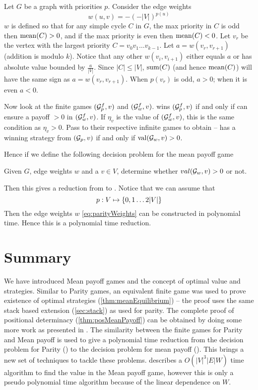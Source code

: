 Let $G$ be a graph with priorities $p$. Consider the edge weights
\begin{equation}
    \label{eq:parityWeights}
    w(u,v) = -(-|V|)^{p(u)}
\end{equation}
$w$ is defined so that for any simple cycle $C$ in $G$, the max priority in $C$ is odd then $\operatorname*{mean}(C)>0$, and if the max priority is even then $\operatorname*{mean}(C)<0$. Let $v_r$ be the vertex with the largest priority $C=v_0v_1 \ldots v_{k-1}$. Let $a=w(v_r,v_{r+1})$ (addition is modulo $k$). Notice that any other $w(v_i,v_{i+1})$ either equals $a$ or has absolute value bounded by $\frac{a}{|V|}$. Since $|C| \leq |V|$, $\operatorname{sum}(C)$ (and hence $\operatorname*{mean}(C)$) will have the same sign as $a=w(v_r,v_{r+1})$. When $p(v_r)$ is odd, $a > 0$; when it is even $a < 0$.

Now look at the finite games $(\mathcal{G}^f_p,v)$ and $(\mathcal{G}^f_w,v)$.  wins $(\mathcal{G}^f_p,v)$ if and only if  can ensure a payoff $>0$ in $(\mathcal{G}^f_w,v)$. If $\eta_v$ is the value of $(\mathcal{G}^f_w, v)$, this is the same condition as $\eta_v > 0$. Pass to their respective infinite games to obtain --  has a winning strategy from $(\mathcal{G}_p,v)$ if and only if $\operatorname{val}(\mathcal{G}_w, v) > 0$.

Hence if we define the following decision problem for the mean payoff game
\begin{decision}[MP]
    \label{dec:meanpayoff}
Given $G$, edge weights $w$ and a $v \in V$, determine whether $val(\mathcal{G}_w,v) > 0$ or not.
\end{decision}
Then this gives a reduction from  to . Notice that we can assume that
\[
    p : V \mapsto \left\{0,1 \ldots 2|V|\right\}
\]
Then the edge weights $w$ \eqref{eq:parityWeights} can be constructed in polynomial time. Hence this is a polynomial time reduction.

\section{Summary}

We have introduced Mean payoff games and the concept of optimal value and strategies. Similar to Parity games, an equivalent finite game was used to prove existence of optimal strategies (\autoref{thm:meanEquilibrium}) -- the proof uses the same stack based extension (\autoref{sec:stack}) as used for parity. The complete proof of positional determinacy (\autoref{thm:posMeanPayoff}) can be obtained by doing some more work as presented in \cite{bjorklund_memoryless_2004}. The similarity between the finite games for Parity and Mean payoff is used to give a polynomial time reduction from the decision problem for Parity () to the decision problem for mean payoff (). This brings a new set of techniques to tackle these problems. \cite{zwick_meanpayoff} describes a $O(|V|^3|E|W)$ time algorithm to find the value in the Mean payoff game, however this is only a pseudo polynomial time algorithm because of the linear dependence on $W$.
